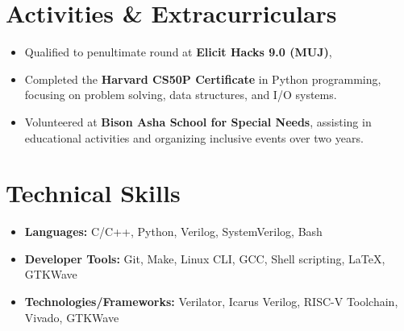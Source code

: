 \documentclass[letterpaper,11pt]{article}
\begin{document}
\section{Activities \& Extracurriculars}
\begin{itemize}[leftmargin=*, itemsep=1pt]
  \item Qualified to penultimate round at \textbf{Elicit Hacks 9.0 (MUJ)}, 
  \item Completed the \textbf{Harvard CS50P Certificate} in Python programming, focusing on problem solving, data structures, and I/O systems.
  \item Volunteered at \textbf{Bison Asha School for Special Needs}, assisting in educational activities and organizing inclusive events over two years.
\end{itemize}

\section{Technical Skills}
\begin{itemize}[leftmargin=*, itemsep=1pt]
  \item \textbf{Languages:} C/C++, Python, Verilog, SystemVerilog, Bash
  \item \textbf{Developer Tools:} Git, Make, Linux CLI, GCC, Shell scripting, LaTeX, GTKWave
  \item \textbf{Technologies/Frameworks:} Verilator, Icarus Verilog, RISC-V Toolchain, Vivado, GTKWave
\end{itemize}
\end{document}
